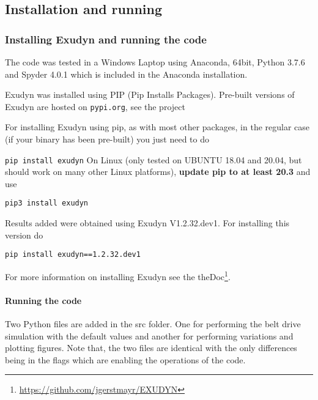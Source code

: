 \ei
\subsection{Installation and running}
\subsubsection{Installing Exudyn and running the code} %
\label{installationInstructions}
The code was tested in a Windows Laptop using Anaconda, 64bit, Python 3.7.6 and Spyder 4.0.1 which is included in the Anaconda installation.

Exudyn was installed using PIP (Pip Installs Packages).
Pre-built versions of Exudyn are hosted on \texttt{pypi.org}, see the project
\bi
 \item {}
\ei
For installing Exudyn using pip, as with most other packages, in the regular case (if your binary has been pre-built) you just need to do
\bi
  \item[] \texttt{pip install exudyn}
\ei
On Linux (only tested on UBUNTU 18.04 and 20.04, but should work on many other Linux platforms), {\bf update pip to at least 20.3} and use 
\bi
  \item[] \texttt{pip3 install exudyn}
\ei

Results added  
were obtained using Exudyn V1.2.32.dev1. For installing this version do
\bi
  \item[] \texttt{pip install exudyn==1.2.32.dev1}
\ei
             
For more information on installing Exudyn see the theDoc\footnote{\url{https://github.com/jgerstmayr/EXUDYN}}.

\paragraph{Running the code}
Two Python files are added in the src folder. One for performing the belt drive simulation with the default values and another for performing variations and plotting figures. Note that, the two files are identical with the only differences being in the flags which are enabling the operations of the code.
 
